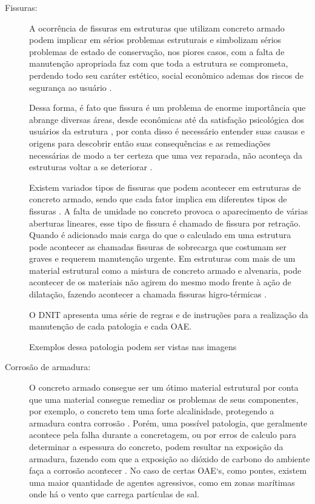 \begin{description}
    \item[Fissuras:]
    A ocorrência de fissuras em estruturas que utilizam concreto armado podem implicar em sérios problemas estruturais e simbolizam sérios problemas de estado de conservação, nos piores casos, com a falta de manutenção apropriada faz com que toda a estrutura se comprometa, perdendo todo seu caráter estético, social econômico ademas dos riscos de segurança ao usuário \cite{santos2014patologia}.
    
    Dessa forma, é fato que fissura é um problema de enorme importância que abrange diversas áreas, desde econômicas até da satisfação psicológica dos usuários da estrutura \cite{andrade1998durabilidade}, por conta disso é necessário entender suas causas e origens para descobrir então suas consequências e as remediações necessárias de modo a ter certeza que uma vez reparada, não aconteça da estruturas voltar a se deteriorar \cite{de1998patologia}.
    
    Existem variados tipos de fissuras que podem acontecer em estruturas de concreto armado, sendo que cada fator implica em diferentes tipos de fissuras \cite{nakamura2007}. 
    A falta de umidade no concreto provoca o aparecimento de várias aberturas lineares, esse tipo de fissura é chamado de fissura por retração. 
    Quando é adicionado mais carga do que o calculado em uma estrutura pode acontecer as chamadas fissuras de sobrecarga que costumam ser graves e requerem manutenção urgente. 
    Em estruturas com mais de um material estrutural como a mistura de concreto armado e alvenaria, pode acontecer de os materiais não agirem do mesmo modo frente à ação de dilatação, fazendo acontecer a chamada fissuras higro-térmicas \cite{nakamura2007}.
    
    O DNIT apresenta uma série de regras e de instruções para a realização da manutenção de cada patologia e cada OAE.
    
    Exemplos dessa patologia podem ser vistas nas imagens
    
    \item[Corrosão de armadura:]
    
    O concreto armado consegue ser um ótimo material estrutural por conta que uma material consegue remediar os problemas de seus componentes, por exemplo, o concreto tem uma forte alcalinidade, protegendo a armadura contra corrosão \cite{pinheiro2010estruturas}.
    Porém, uma possível patologia, que geralmente acontece pela falha durante a concretagem, ou por erros de calculo para determinar a espessura do concreto, podem resultar na exposição da armadura, fazendo com que a exposição ao dióxido de carbono do ambiente faça a corrosão acontecer \cite{statera}. 
    No caso de certas OAE`s, como pontes, existem uma maior quantidade de agentes agressivos, como em zonas marítimas onde há o vento que carrega partículas de sal\cite{statera}.


\end{description}
